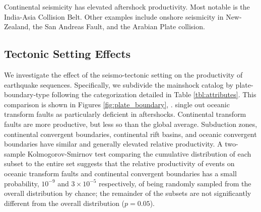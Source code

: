 \documentclass[draft, jgrga]{agujournal2018}
\begin{document}
    Continental seismicity has elevated aftershock productivity. Most notable is the India-Asia Collision Belt. Other examples include onshore seismicity in New-Zealand, the San Andreas Fault, and the Arabian Plate collision.
    
    \subsection{Tectonic Setting Effects}\label{sec:tectonic_setting}
    
    We investigate the effect of the seismo-tectonic setting on the productivity of earthquake sequences. Specifically, we subdivide the mainshock catalog by plate-boundary-type following the categorization detailed in Table \ref{tbl:attributes}. This comparison is shown in Figures \ref{fig:plate_boundary}, .  single out oceanic transform faults as particularly deficient in aftershocks. Continental transform faults are more productive, but less so than the global average. Subduction zones, continental convergent boundaries, continental rift basins, and oceanic convergent boundaries have similar and generally elevated relative productivity. A two-sample Kolmogorov-Smirnov test comparing the cumulative distribution of each subset to the entire set suggests that the relative productivity of events on oceanic transform faults and continental convergent boundaries has a small probability, $10^{-9}$ and $3\times10^{-5}$ respectively, of being randomly sampled from the overall distribution by chance; the remainder of the subsets are not significantly different from the overall distribution ($p = 0.05$). 
    
\end{document}
